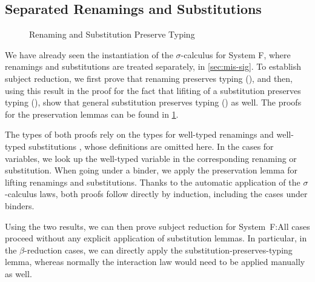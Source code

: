 \documentclass[screen,nonacm]{acmart}
\begin{document}
\noindent\begin{minipage}[t]{0.48\linewidth}
      \raggedright{}
      \EUpArrow{}
\end{minipage}
\begin{minipage}[t]{0.48\linewidth}
      \raggedright{}
      \ETypeOf{}
\end{minipage}

\subsection*{Separated Renamings and Substitutions}
\begin{figure}[!t]
      \centering
      \begin{minipage}[t]{0.48\linewidth}
            \raggedright{}
            \ERPT{}
      \end{minipage}
      \begin{minipage}[t]{0.48\linewidth}
            \raggedright{}
            \ESPT{}
      \end{minipage}
      \caption{Renaming and Substitution Preserve Typing}\label{fig:ext-rst}
\end{figure}

We have already seen the instantiation of the $σ$-calculus for System F, where
renamings and substitutions are treated separately, in \cref{sec:mis-sig}. To
establish subject reduction, we first prove that renaming preserves typing
(), and then, using this result in the proof for the fact
that lifiting of a substitution preserves typing (), show
that general substitution preserves typing () as well.
The proofs for the preservation lemmas can be found in \cref{fig:ext-rst}.

The types of both proofs rely on the types for well-typed renamings \EWTR{} and
well-typed substitutions \EWTS{}, whose definitions are omitted here. In the
cases for variables, we look up the well-typed variable in the corresponding
renaming or substitution. When going under a binder, we apply the preservation
lemma for lifting renamings and substitutions. Thanks to the automatic
application of the $σ$-calculus laws, both proofs follow directly by induction,
including the cases under binders.

Using the two results, we can then prove subject reduction for
System~F:\ESR{}All cases proceed without any explicit application of
substitution lemmas. In particular, in the $β$-reduction cases, we can directly
apply the substitution-preserves-typing lemma, whereas normally the interaction
law would need to be applied manually as well.
\end{document}
